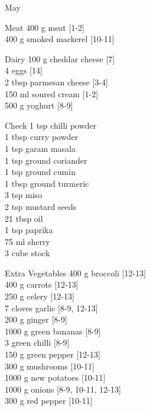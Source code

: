 \begin{menu}{May}
\begin{shoppinglist}{Meat}
      400 g meat {\scriptsize[1-2]}\\
      400 g smoked mackerel {\scriptsize[10-11]}\\
      \end{shoppinglist}%
      \begin{shoppinglist}{Dairy}
      100 g cheddar cheese {\scriptsize[7]}\\
      4  eggs {\scriptsize[14]}\\
      2 tbsp parmesan cheese {\scriptsize[3-4]}\\
      150 ml soured cream {\scriptsize[1-2]}\\
      500 g yoghurt {\scriptsize[8-9]}\\
      \end{shoppinglist}%
      \par\vfil %
      \vfil\clearpage %
      \begin{shoppinglist}{Check}
      1 tsp chilli powder \\
      1 tbsp curry powder \\
      1 tsp garam masala \\
      1 tsp ground coriander \\
      1 tsp ground cumin \\
      1 tbsp ground turmeric \\
      3 tsp miso \\
      2 tsp mustard seeds \\
      21 tbsp oil \\
      1 tsp paprika \\
      75 ml sherry \\
      3 cube stock \\
      \end{shoppinglist}%
      \begin{shoppinglist}{Extra Vegetables}
      400 g broccoli {\scriptsize[12-13]}\\
      400 g carrots {\scriptsize[12-13]}\\
      250 g celery {\scriptsize[12-13]}\\
      7 cloves garlic {\scriptsize[8-9, 12-13]}\\
      200 g ginger {\scriptsize[8-9]}\\
      1000 g green bananas {\scriptsize[8-9]}\\
      3  green chilli {\scriptsize[8-9]}\\
      150 g green pepper {\scriptsize[12-13]}\\
      300 g mushrooms {\scriptsize[10-11]}\\
      1000 g new potatoes {\scriptsize[10-11]}\\
      1000 g onions {\scriptsize[8-9, 10-11, 12-13]}\\
      300 g red pepper {\scriptsize[10-11]}\\
      \end{shoppinglist}%
      \par\vfil %
    \vfil\clearpage
  

\end{menu}
